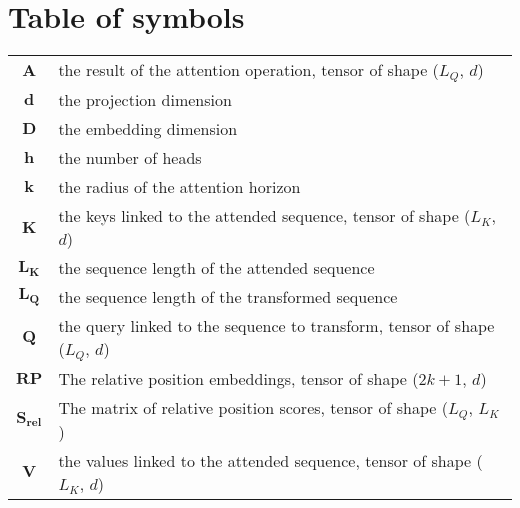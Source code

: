 \section*{Table of symbols}

\begin{tabular}{cp{}}
	$\boldsymbol{A}$ & the result of the attention operation, tensor of shape ($L_Q$, $d$)\\
	$\boldsymbol{d}$ & the projection dimension\\
	$\boldsymbol{D}$ & the embedding dimension\\
	$\boldsymbol{h}$ & the number of heads\\
	$\boldsymbol{k}$ & the radius of the attention horizon\\
	$\boldsymbol{K}$ & the keys linked to the attended sequence, tensor of shape ($L_K$, $d$)\\
	$\boldsymbol{L_K}$ & the sequence length of the attended sequence\\
	$\boldsymbol{L_Q}$ & the sequence length of the transformed sequence\\
	$\boldsymbol{Q}$ & the query linked to the sequence to transform, tensor of shape ($L_Q$, $d$)\\
	$\boldsymbol{RP}$ & The relative position embeddings, tensor of shape ($2k+1$, $d$)\\
	$\boldsymbol{S_{rel}}$ & The matrix of relative position scores, tensor of shape ($L_Q$, $L_K$)\\
	$\boldsymbol{V}$ & the values linked to the attended sequence, tensor of shape ($L_K$, $d$)\\
\end{tabular}

\endinput